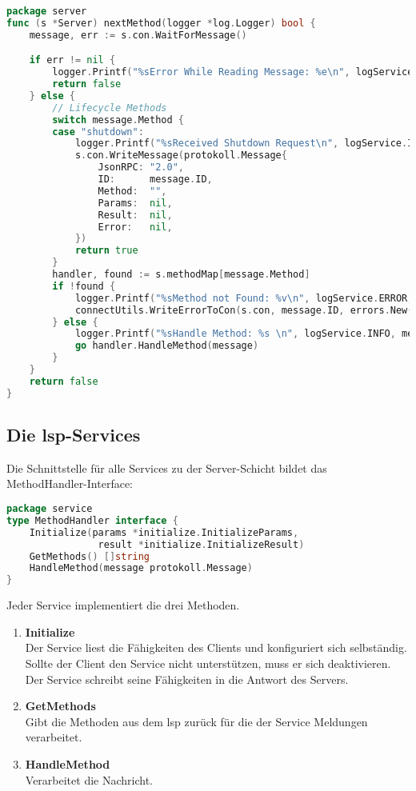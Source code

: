 \documentclass[./einleitung.tex]{subfiles}
\begin{document}
    \begin{lstlisting}[language=Go, caption=Verarbeitung einer Nachricht, label=lst:handleMethod]
package server
func (s *Server) nextMethod(logger *log.Logger) bool {
	message, err := s.con.WaitForMessage()

	if err != nil {
		logger.Printf("%sError While Reading Message: %e\n", logService.ERROR, err)
		return false
	} else {
		// Lifecycle Methods
		switch message.Method {
		case "shutdown":
			logger.Printf("%sReceived Shutdown Request\n", logService.INFO)
			s.con.WriteMessage(protokoll.Message{
				JsonRPC: "2.0",
				ID:      message.ID,
				Method:  "",
				Params:  nil,
				Result:  nil,
				Error:   nil,
			})
			return true
		}
		handler, found := s.methodMap[message.Method]
		if !found {
			logger.Printf("%sMethod not Found: %v\n", logService.ERROR, message)
			connectUtils.WriteErrorToCon(s.con, message.ID, errors.New("method not found"), protokoll.MethodNotFound)
		} else {
			logger.Printf("%sHandle Method: %s \n", logService.INFO, message.Method)
			go handler.HandleMethod(message)
		}
	}
	return false
}
    \end{lstlisting}
    \subsection{Die \acrshort{lsp}-Services}
    Die Schnittstelle für alle Services zu der Server-Schicht bildet das MethodHandler-Interface:
    \begin{lstlisting}[language=Go]
package service
type MethodHandler interface {
	Initialize(params *initialize.InitializeParams,
                result *initialize.InitializeResult)
	GetMethods() []string
	HandleMethod(message protokoll.Message)
}
    \end{lstlisting}
    Jeder Service implementiert die drei Methoden.
    \begin{enumerate}
        \item \textbf{Initialize} \\
        Der Service liest die Fähigkeiten des Clients und konfiguriert sich selbständig.
        Sollte der Client den Service nicht unterstützen, muss er sich deaktivieren.
        Der Service schreibt seine Fähigkeiten in die Antwort des Servers.
        \item \textbf{GetMethods} \\
        Gibt die Methoden aus dem \acrshort{lsp} zurück für die der Service Meldungen verarbeitet.
        \item \textbf{HandleMethod} \\
        Verarbeitet die Nachricht.
    \end{enumerate}
\end{document}
